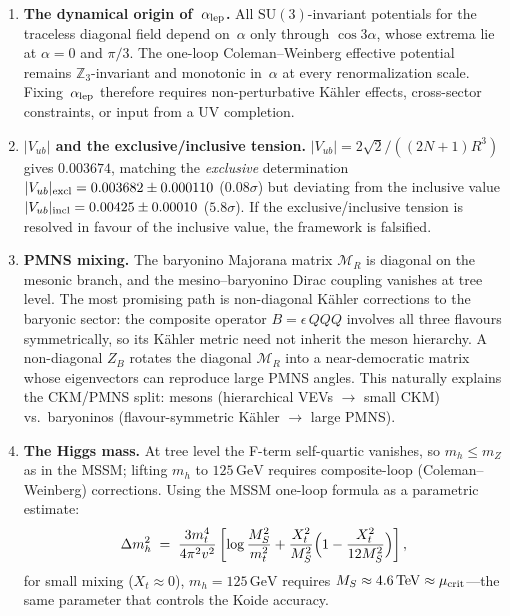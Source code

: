 \documentclass[12pt,a4paper]{article}
\newcommand{\SU}{\mathrm{SU}}
\newcommand{\GeV}{\,\mathrm{GeV}}
\newcommand{\TeV}{\,\mathrm{TeV}}
\begin{document}
\begin{enumerate}
  \item \textbf{The dynamical origin of~$\alpha_{\rm lep}$.}
    All $\SU(3)$-invariant potentials for the traceless diagonal field
    depend on~$\alpha$ only through $\cos 3\alpha$, whose extrema lie at
    $\alpha = 0$ and $\pi/3$.  The one-loop Coleman--Weinberg effective
    potential remains $\mathbb{Z}_3$-invariant
    and monotonic in~$\alpha$ at every renormalization scale.
    Fixing~$\alpha_{\rm lep}$
    therefore requires non-perturbative K\"ahler effects,
    cross-sector constraints, or input from a UV completion.

  \item \textbf{$|V_{ub}|$ and the exclusive/inclusive tension.}
    $|V_{ub}| = 2\sqrt{2}/((2N{+}1)R^3)$ gives $0.003674$,
    matching the \emph{exclusive} determination
    $|V_{ub}|_{\rm excl} = 0.003682 \pm 0.000110$ ($0.08\sigma$) but
    deviating from the inclusive value
    $|V_{ub}|_{\rm incl} = 0.00425 \pm 0.00010$ ($5.8\sigma$).
    If the exclusive/inclusive tension
    is resolved in favour of the inclusive value, the framework is
    falsified.

  \item \textbf{PMNS mixing.}
    The baryonino Majorana matrix $\mathcal{M}_R$ is
    diagonal on the mesonic branch, and the
    mesino--baryonino Dirac coupling vanishes at tree level.
    The most promising path is non-diagonal K\"ahler corrections
    to the baryonic sector: the composite operator $B = \epsilon\,QQQ$
    involves all three flavours symmetrically, so its K\"ahler metric
    need not inherit the meson hierarchy.  A non-diagonal $Z_B$
    rotates the diagonal $\mathcal{M}_R$ into a near-democratic
    matrix whose eigenvectors can reproduce large PMNS angles.
    This naturally explains the CKM/PMNS split: mesons (hierarchical
    VEVs $\to$ small CKM) vs.\ baryoninos (flavour-symmetric
    K\"ahler $\to$ large PMNS).

  \item \textbf{The Higgs mass.}
    At tree level the F-term self-quartic vanishes, so
    $m_h \le m_Z$ as in the MSSM; lifting $m_h$ to $125\GeV$ requires
    composite-loop (Coleman--Weinberg) corrections.
    Using the MSSM one-loop formula as a parametric estimate:
    \begin{equation}
      \Delta m_h^2 \;=\; \frac{3 m_t^4}{4\pi^2 v^2}\,
      \biggl[\log\frac{M_S^2}{m_t^2}
        + \frac{X_t^2}{M_S^2}\Bigl(1 - \frac{X_t^2}{12 M_S^2}\Bigr)
      \biggr]\,,
      \label{eq:higgs_CW}
    \end{equation}
    for small mixing ($X_t \approx 0$), $m_h = 125\GeV$ requires
    $M_S \approx 4.6\TeV \approx \mu_{\rm crit}$---the same
    parameter that controls the Koide accuracy.


\end{enumerate}
\end{document}
